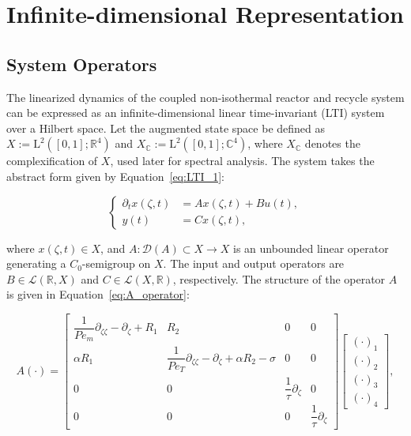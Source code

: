 \section{Infinite-dimensional Representation} \label{sec:3_LTI}

\subsection{System Operators}

The linearized dynamics of the coupled non-isothermal reactor and recycle system can be expressed as an infinite-dimensional linear time-invariant (LTI) system over a Hilbert space. Let the augmented state space be defined as $X := \mathrm{L}^2([0,1]; \mathbb{R}^4)$ and $X_\mathbb{C} := \mathrm{L}^2([0,1]; \mathbb{C}^4)$, where $X_\mathbb{C}$ denotes the complexification of $X$, used later for spectral analysis. The system takes the abstract form given by Equation~\eqref{eq:LTI_1}:

\begin{equation} \label{eq:LTI_1}
\begin{cases}
\partial_t x(\zeta, t) &= A x(\zeta, t) + B u(t), \\
y(t) &= C x(\zeta, t),
\end{cases}
\end{equation}

where $x(\zeta, t) \in X$, and $A : \mathcal{D}(A) \subset X \to X$ is an unbounded linear operator generating a $C_0$-semigroup on $X$. The input and output operators are $B \in \mathcal{L}(\mathbb{R}, X)$ and $C \in \mathcal{L}(X, \mathbb{R})$, respectively. The structure of the operator $A$ is given in Equation~\eqref{eq:A_operator}:

\begin{equation} \label{eq:A_operator}
A (\cdot) =
\begin{bmatrix} 
\dfrac{1}{Pe_m} \partial_{\zeta\zeta} - \partial_\zeta + R_1 & R_2 & 0 & 0 \\
\alpha R_1 & \dfrac{1}{Pe_T} \partial_{\zeta\zeta} - \partial_\zeta + \alpha R_2 - \sigma & 0 & 0 \\
0 & 0 & \dfrac{1}{\tau} \partial_\zeta & 0 \\
0 & 0 & 0 & \dfrac{1}{\tau} \partial_\zeta
\end{bmatrix} \begin{bmatrix} (\cdot)_1 \\ (\cdot)_2 \\ (\cdot)_3 \\ (\cdot)_4 \end{bmatrix},
\end{equation}

